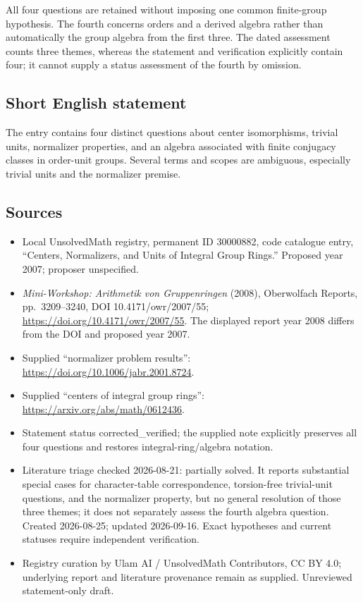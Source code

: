 \documentclass[11pt]{article}
\begin{document}
All four questions are retained without imposing one common finite-group hypothesis. The fourth concerns orders and a derived algebra rather than automatically the group algebra from the first three. The dated assessment counts three themes, whereas the statement and verification explicitly contain four; it cannot supply a status assessment of the fourth by omission.
\subsection{Short English statement}
The entry contains four distinct questions about center isomorphisms, trivial units, normalizer properties, and an algebra associated with finite conjugacy classes in order-unit groups. Several terms and scopes are ambiguous, especially trivial units and the normalizer premise.
\subsection{Sources}
\begin{itemize}
\item Local UnsolvedMath registry, permanent ID 30000882, code catalogue entry, ``Centers, Normalizers, and Units of Integral Group Rings.'' Proposed year 2007; proposer unspecified.
\item \emph{Mini-Workshop: Arithmetik von Gruppenringen} (2008), Oberwolfach Reports, pp.\ 3209--3240, DOI 10.4171/owr/2007/55; \url{https://doi.org/10.4171/owr/2007/55}. The displayed report year 2008 differs from the DOI and proposed year 2007.
\item Supplied ``normalizer problem results'': \url{https://doi.org/10.1006/jabr.2001.8724}.
\item Supplied ``centers of integral group rings'': \url{https://arxiv.org/abs/math/0612436}.
\item Statement status corrected\_verified; the supplied note explicitly preserves all four questions and restores integral-ring/algebra notation.
\item Literature triage checked 2026-08-21: partially solved. It reports substantial special cases for character-table correspondence, torsion-free trivial-unit questions, and the normalizer property, but no general resolution of those three themes; it does not separately assess the fourth algebra question. Created 2026-08-25; updated 2026-09-16. Exact hypotheses and current statuses require independent verification.
\item Registry curation by Ulam AI / UnsolvedMath Contributors, CC BY 4.0; underlying report and literature provenance remain as supplied. Unreviewed statement-only draft.
\end{itemize}
\end{document}
